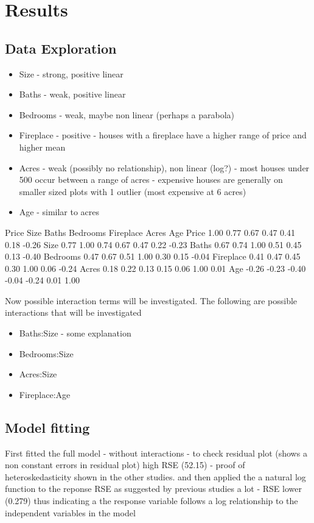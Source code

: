 \documentclass[10pt,A4,makeidx]{article}
\begin{document}
\section{Results}
  \subsection{Data Exploration}
  \begin{itemize}
    \item Size - strong, positive linear
    \item Baths - weak, positive linear
    \item Bedrooms - weak, maybe non linear (perhaps a parabola)
    \item Fireplace - positive - houses with a fireplace have a higher range of price
    and higher mean
    \item Acres - weak (possibly no relationship), non linear (log?) - most houses under 
    500 occur between a range of acres - expensive houses are generally on smaller
    sized plots with 1 outlier (most expensive at 6 acres)
    \item Age - similar to acres 
  \end{itemize}
  
  \emph{}
  \begin{Soutput}
              Price  Size Baths Bedrooms Fireplace Acres   Age
    Price      1.00  0.77  0.67     0.47      0.41  0.18 -0.26
    Size       0.77  1.00  0.74     0.67      0.47  0.22 -0.23
    Baths      0.67  0.74  1.00     0.51      0.45  0.13 -0.40
    Bedrooms   0.47  0.67  0.51     1.00      0.30  0.15 -0.04
    Fireplace  0.41  0.47  0.45     0.30      1.00  0.06 -0.24
    Acres      0.18  0.22  0.13     0.15      0.06  1.00  0.01
    Age       -0.26 -0.23 -0.40    -0.04     -0.24  0.01  1.00
  \end{Soutput}

  Now possible interaction terms will be investigated. The following are possible 
  interactions that will be investigated
  \begin{itemize}
  \item Baths:Size - some explanation
  \item Bedrooms:Size
  \item Acres:Size
  \item Fireplace:Age
  \end{itemize}

  \subsection{Model fitting}
  First fitted the full model - without interactions - to check residual plot
  (shows a non constant errors in residual plot) high RSE (52.15) - proof of 
  heteroskedasticity shown in the other studies.
  and then applied the  a natural log function to the reponse RSE as suggested by
  previous studies a lot - RSE lower (0.279) thus indicating a the response variable
  follows a log relationship to the independent variables in the model
\end{document}
